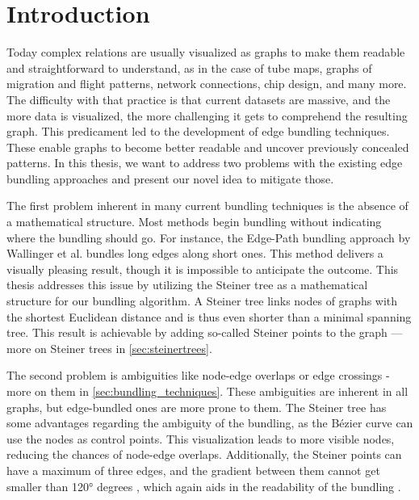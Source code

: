 
\chapter{Introduction}
\label{sec:introduction}

Today complex relations are usually visualized as graphs to make them readable and straightforward to understand, as in the case of tube maps, graphs of migration and flight patterns, network connections, chip design, and many more. 
The difficulty with that practice is that current datasets are massive, and the more data is visualized, the more challenging it gets to comprehend the resulting graph. This predicament led to the development of edge bundling techniques. These enable graphs to become better readable and uncover previously concealed patterns. In this thesis, we want to address two problems with the existing edge bundling approaches and present our novel idea to mitigate those.

The first problem inherent in many current bundling techniques is the absence of a mathematical structure. Most methods begin bundling without indicating where the bundling should go. For instance, the Edge-Path bundling approach by Wallinger et al. \cite{wallinger_edge-path_2022} bundles long edges along short ones. This method delivers a visually pleasing result, though it is impossible to anticipate the outcome. This thesis addresses this issue by utilizing the Steiner tree as a mathematical structure for our bundling algorithm. A Steiner tree links nodes of graphs with the shortest Euclidean distance and is thus even shorter than a minimal spanning tree. This result is achievable by adding so-called Steiner points to the graph \cite{brazil_optimal_2015} — more on Steiner trees in \autoref{sec:steinertrees}.

The second problem is ambiguities like node-edge overlaps or edge crossings - more on them in \autoref{sec:bundling_techniques}. These ambiguities are inherent in all graphs, but edge-bundled ones are more prone to them. The Steiner tree has some advantages regarding the ambiguity of the bundling, as the B\'{e}zier curve can use the nodes as control points. This visualization leads to more visible nodes, reducing the chances of node-edge overlaps. Additionally, the Steiner points can have a maximum of three edges, and the gradient between them cannot get smaller than 120° degrees \cite{brazil_optimal_2015}, which again aids in the readability of the bundling \cite{huang_effects_2008}.

